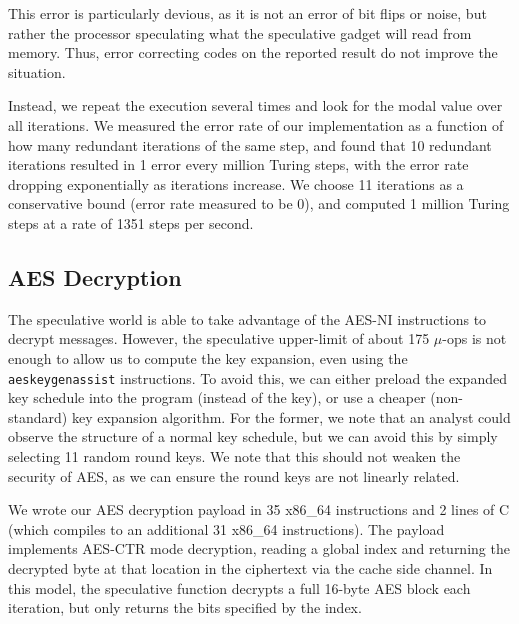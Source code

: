 This error is particularly devious, as it is not an error of bit flips or noise,
but rather the processor speculating what the speculative gadget will read from
memory. Thus, error correcting codes on the reported result do not improve the
situation.


Instead, we repeat the execution several times and look for the modal value over
all iterations. We measured the error rate of our implementation as a function
of how many redundant iterations of the same step, and found that 10 redundant
iterations resulted in 1 error every million Turing steps, with the error rate
dropping exponentially as iterations increase. We choose 11 iterations as a
conservative bound (error rate measured to be 0), and computed 1 million Turing
steps at a rate of 1351 steps per second.






\subsection{AES Decryption}
\label{subsec:impl-aes}
The speculative world is able to take advantage of the AES-NI instructions to
decrypt messages. However, the speculative upper-limit of about 175 $\mu$-ops is
not enough to allow us to compute the key expansion, even using the
\texttt{aeskeygenassist} instructions. To avoid this, we can either preload the
expanded key schedule into the program (instead of the key), or use a cheaper
(non-standard) key expansion algorithm. For the former, we note that an analyst
could observe the structure of a normal key schedule, but we can avoid this by
simply selecting 11 random round keys. We note that this should not weaken the
security of AES, as we can ensure the round keys are not linearly related.


%

We wrote our AES decryption payload in 35 x86\_64 instructions and 2 lines of C
(which compiles to an additional 31 x86\_64 instructions). The payload
implements AES-CTR mode decryption, reading a global index and returning the
decrypted byte at that location in the ciphertext via the cache side channel.
In this model, the speculative function decrypts a full 16-byte AES block each
iteration, but only returns the bits specified by the index.


